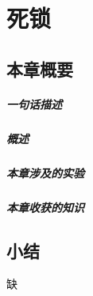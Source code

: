 \chapter{死锁}\label{ch_deadlock}

\section{本章概要}

\paragraph{一句话描述}

\paragraph{概述}

\paragraph{本章涉及的实验}

\paragraph{本章收获的知识}

%
%
%
%
%
%
%


\section{小结}
缺